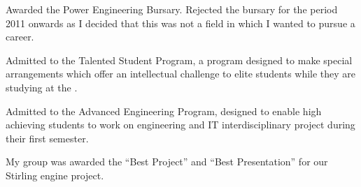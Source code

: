 \begin{achievements}

{Awarded the  Power Engineering Bursary.
Rejected the bursary for the period 2011 onwards as I decided that this was not
a field in which I wanted to pursue a career.}

{Admitted to the  Talented Student
Program, a program designed to make special arrangements which offer an
intellectual challenge to elite students while they are studying at the
.}

{Admitted to the  Advanced
Engineering Program, designed to enable high achieving students to work on
engineering and IT interdisciplinary project during their first semester.

My group was awarded the ``Best Project'' and ``Best Presentation'' for our
Stirling engine project.}

\end{achievements}
